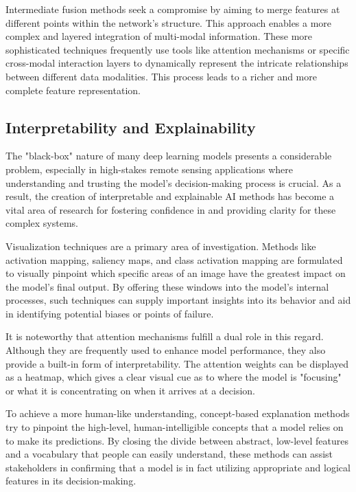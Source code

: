 \documentclass[12pt,a4paper]{article}
\begin{document}
Intermediate fusion methods seek a compromise by aiming to merge features at different points within the network's structure. This approach enables a more complex and layered integration of multi-modal information. These more sophisticated techniques frequently use tools like attention mechanisms or specific cross-modal interaction layers to dynamically represent the intricate relationships between different data modalities. This process leads to a richer and more complete feature representation.

\subsection{Interpretability and Explainability}
The "black-box" nature of many deep learning models presents a considerable problem, especially in high-stakes remote sensing applications where understanding and trusting the model's decision-making process is crucial. As a result, the creation of interpretable and explainable AI methods has become a vital area of research for fostering confidence in and providing clarity for these complex systems.

Visualization techniques are a primary area of investigation. Methods like activation mapping, saliency maps, and class activation mapping are formulated to visually pinpoint which specific areas of an image have the greatest impact on the model's final output. By offering these windows into the model's internal processes, such techniques can supply important insights into its behavior and aid in identifying potential biases or points of failure.

It is noteworthy that attention mechanisms fulfill a dual role in this regard. Although they are frequently used to enhance model performance, they also provide a built-in form of interpretability. The attention weights can be displayed as a heatmap, which gives a clear visual cue as to where the model is "focusing" or what it is concentrating on when it arrives at a decision.

To achieve a more human-like understanding, concept-based explanation methods try to pinpoint the high-level, human-intelligible concepts that a model relies on to make its predictions. By closing the divide between abstract, low-level features and a vocabulary that people can easily understand, these methods can assist stakeholders in confirming that a model is in fact utilizing appropriate and logical features in its decision-making.
\end{document}
